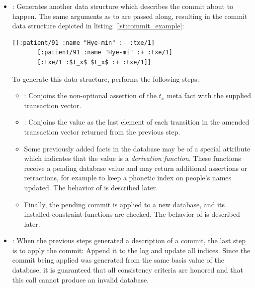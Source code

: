 \begin{itemize}
  \item {}: Generates another data structure which describes the commit about to happen. The same arguments as to  are passed along, resulting in the commit data structure depicted in listing~\ref{lst:commit_example}:

  \begin{lstlisting}[label={lst:commit_example},morekeywords={:txe/1},caption=A commit of one retraction and two assertions]
      [[:patient/91 :name "Hye-min" :- :txe/1]
       [:patient/91 :name "Hye-mi" :+ :txe/1]
       [:txe/1 :$t_x$ $t_x$ :+ :txe/1]]
  \end{lstlisting}

  To generate this data structure,  performs the following steps:
  \begin{itemize}
    \item {}: Conjoins the non-optional assertion of the $t_x$ meta fact with the supplied transaction vector.

    \item {}: Conjoins the  value as the last element of each transition in the amended transaction vector returned from the previous step.

    \item {} Some previously added facts in the database may be of a special attribute which indicates that the value is a \emph{derivation function}. These functions receive a pending database value and may return additional assertions or retractions, for example to keep a phonetic index on people's names updated. The behavior of  is described later.

    \item {} Finally, the pending commit is applied to a new database, and its installed constraint functions are checked. The behavior of  is described later.
  \end{itemize}

  \item {}: When the previous steps generated a description of a commit, the last step is to apply the commit: Append it to the log and update all indices. Since the commit being applied was generated from the same basis value of the database, it is guaranteed that all consistency criteria are honored and that this call cannot produce an invalid database.
\end{itemize}

